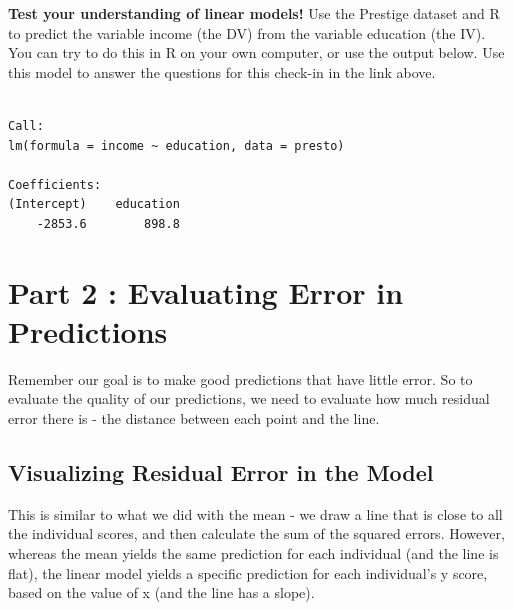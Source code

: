 \documentclass[
  letterpaper,
  DIV=11,
  numbers=noendperiod,
  oneside]{scrreprt}
\begin{document}
\begin{tcolorbox}[enhanced jigsaw, toptitle=1mm, toprule=.15mm, rightrule=.15mm, breakable, left=2mm, colbacktitle=quarto-callout-note-color!10!white, colback=white, opacityback=0, coltitle=black, bottomtitle=1mm, opacitybacktitle=0.6, titlerule=0mm, leftrule=.75mm, arc=.35mm, bottomrule=.15mm, title=\textcolor{quarto-callout-note-color}{\faInfo}\hspace{0.5em}{\href{https://docs.google.com/forms/d/e/1FAIpQLSev3Ot9gGd9QcHpEh5GhWifCAA7c_A-ycKT-7Zg5orC3dtGlg/viewform?usp=sf_link}{Check-In:
Intercepts and Slopes}}, colframe=quarto-callout-note-color-frame]

\textbf{Test your understanding of linear models!} Use the Prestige
dataset and R to predict the variable income (the DV) from the variable
education (the IV). You can try to do this in R on your own computer, or
use the output below. Use this model to answer the questions for this
check-in in the link above.

\begin{verbatim}

Call:
lm(formula = income ~ education, data = presto)

Coefficients:
(Intercept)    education  
    -2853.6        898.8  
\end{verbatim}

\end{tcolorbox}

\chapter{Part 2 : Evaluating Error in
Predictions}\label{part-2-evaluating-error-in-predictions}

Remember our goal is to make good predictions that have little error. So
to evaluate the quality of our predictions, we need to evaluate how much
residual error there is - the distance between each point and the line.

\section{Visualizing Residual Error in the
Model}\label{visualizing-residual-error-in-the-model}

This is similar to what we did with the mean - we draw a line that is
close to all the individual scores, and then calculate the sum of the
squared errors. However, whereas the mean yields the same prediction for
each individual (and the line is flat), the linear model yields a
specific prediction for each individual's y score, based on the value of
x (and the line has a slope).
\end{document}
